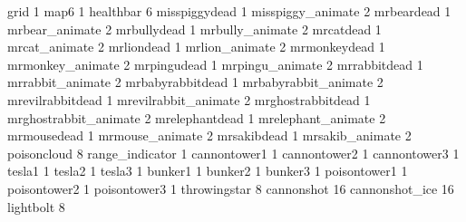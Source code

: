 grid 1
map6 1
healthbar 6
misspiggydead 1
misspiggy_animate 2
mrbeardead 1
mrbear_animate 2
mrbullydead 1
mrbully_animate 2
mrcatdead 1
mrcat_animate 2
mrliondead 1
mrlion_animate 2
mrmonkeydead 1
mrmonkey_animate 2
mrpingudead 1
mrpingu_animate 2
mrrabbitdead 1
mrrabbit_animate 2
mrbabyrabbitdead 1
mrbabyrabbit_animate 2
mrevilrabbitdead 1
mrevilrabbit_animate 2
mrghostrabbitdead 1
mrghostrabbit_animate 2
mrelephantdead 1
mrelephant_animate 2
mrmousedead 1
mrmouse_animate 2
mrsakibdead 1
mrsakib_animate 2
poisoncloud 8
range_indicator 1
cannontower1 1
cannontower2 1
cannontower3 1
tesla1 1
tesla2 1
tesla3 1
bunker1 1
bunker2 1
bunker3 1
poisontower1 1
poisontower2 1
poisontower3 1
throwingstar 8
cannonshot 16
cannonshot_ice 16
lightbolt 8
